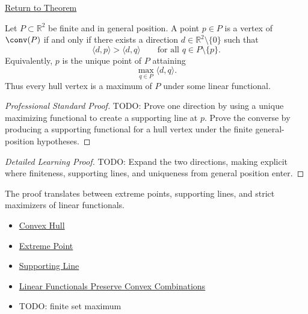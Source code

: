 \newpage
{}
\label{prf:computational-geometry-supporting-functional-hull-vertices}

\begin{remark*}[Return]
\hyperref[thm:computational-geometry-supporting-functional-hull-vertices]{Return to Theorem}
\end{remark*}

\begin{theorem*}
Let \(P\subset\mathbb{R}^2\) be finite and in general position. A point \(p\in P\)
is a vertex of \(\conv(P)\) if and only if there exists a direction
\(d\in\mathbb{R}^2\setminus\{0\}\) such that
\[
  \langle d,p\rangle>\langle d,q\rangle
  \qquad
  \text{for all } q\in P\setminus\{p\}.
\]
Equivalently, \(p\) is the unique point of \(P\) attaining
\[
  \max_{q\in P}\langle d,q\rangle.
\]
Thus every hull vertex is a maximum of \(P\) under some linear functional.
\end{theorem*}

\begin{proof}[Professional Standard Proof]
\LRAProofBodyStart
TODO: Prove one direction by using a unique maximizing functional to create a
supporting line at \(p\). Prove the converse by producing a supporting
functional for a hull vertex under the finite general-position hypotheses.
\end{proof}

\begin{proof}[Detailed Learning Proof]
\LRAProofBodyStart
TODO: Expand the two directions, making explicit where finiteness, supporting
lines, and uniqueness from general position enter.
\end{proof}

\begin{remark*}
The proof translates between extreme points, supporting lines, and strict
maximizers of linear functionals.
\end{remark*}

\begin{dependencies}
\begin{itemize}
  \item \hyperref[def:computational-geometry-convex-hull]{Convex Hull}
  \item \hyperref[def:computational-geometry-extreme-point]{Extreme Point}
  \item \hyperref[def:computational-geometry-supporting-line]{Supporting Line}
  \item \hyperref[lem:computational-geometry-linear-functionals-convex-combinations]{Linear Functionals Preserve Convex Combinations}
  \item TODO: finite set maximum
\end{itemize}
\end{dependencies}

\clearpage
